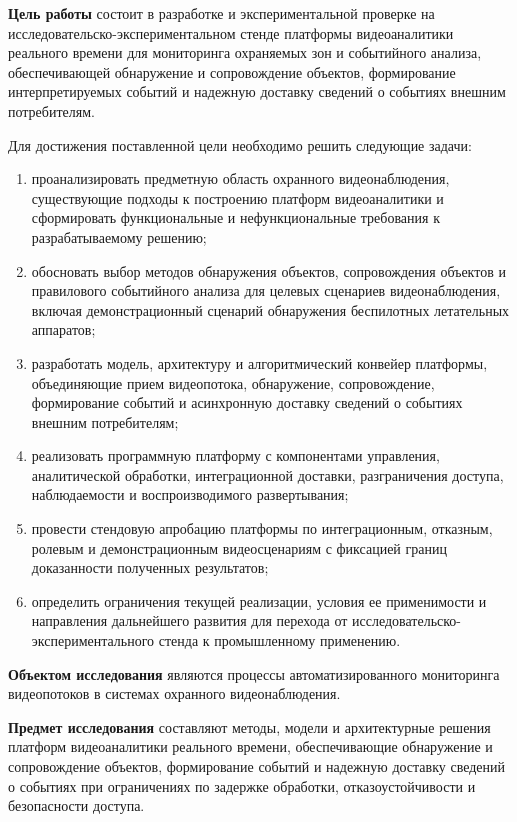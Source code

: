 \textbf{Цель работы} состоит в разработке и экспериментальной проверке на исследовательско-экспериментальном стенде платформы видеоаналитики реального времени для мониторинга охраняемых зон и событийного анализа, обеспечивающей обнаружение и сопровождение объектов, формирование интерпретируемых событий и надежную доставку сведений о событиях внешним потребителям.

Для достижения поставленной цели необходимо решить следующие задачи:
\begin{enumerate}
    \item проанализировать предметную область охранного видеонаблюдения, существующие подходы к построению платформ видеоаналитики и сформировать функциональные и нефункциональные требования к разрабатываемому решению;
    \item обосновать выбор методов обнаружения объектов, сопровождения объектов и правилового событийного анализа для целевых сценариев видеонаблюдения, включая демонстрационный сценарий обнаружения беспилотных летательных аппаратов;
    \item разработать модель, архитектуру и алгоритмический конвейер платформы, объединяющие прием видеопотока, обнаружение, сопровождение, формирование событий и асинхронную доставку сведений о событиях внешним потребителям;
    \item реализовать программную платформу с компонентами управления, аналитической обработки, интеграционной доставки, разграничения доступа, наблюдаемости и воспроизводимого развертывания;
    \item провести стендовую апробацию платформы по интеграционным, отказным, ролевым и демонстрационным видеосценариям с фиксацией границ доказанности полученных результатов;
    \item определить ограничения текущей реализации, условия ее применимости и направления дальнейшего развития для перехода от исследовательско-экспериментального стенда к промышленному применению.
\end{enumerate}

\textbf{Объектом исследования} являются процессы автоматизированного мониторинга видеопотоков в системах охранного видеонаблюдения.

\textbf{Предмет исследования} составляют методы, модели и архитектурные решения платформ видеоаналитики реального времени, обеспечивающие обнаружение и сопровождение объектов, формирование событий и надежную доставку сведений о событиях при ограничениях по задержке обработки, отказоустойчивости и безопасности доступа.

